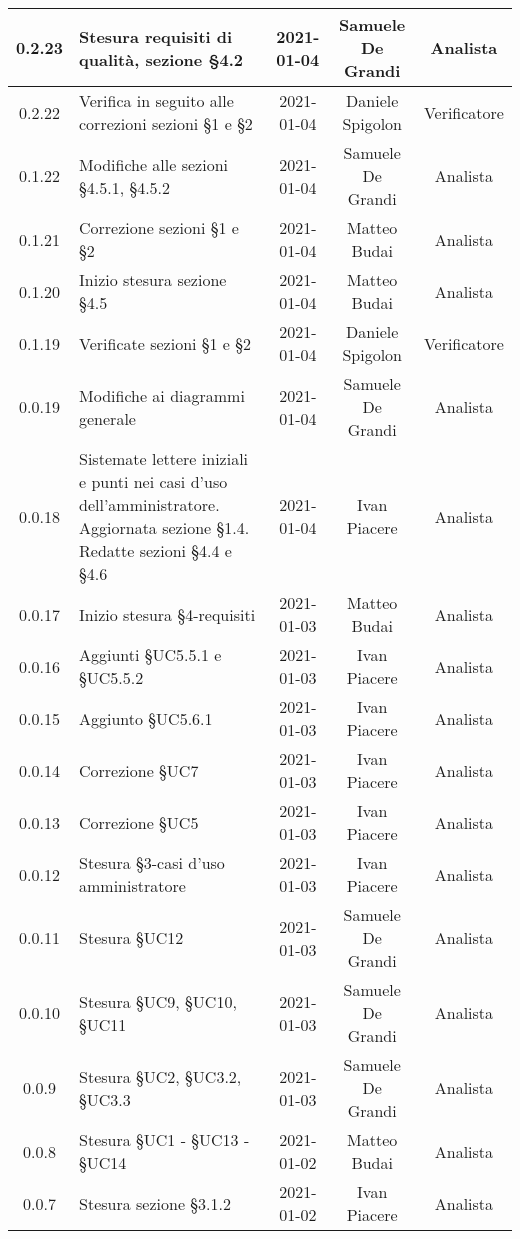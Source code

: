 \begin{center}
\begin{longtable}{|c|p{5cm}|c|c|c|}
		\hline
		0.2.23 & Stesura requisiti di qualità, sezione §4.2  & 2021-01-04 & Samuele De Grandi & Analista \\
		\hline
		0.2.22 & Verifica in seguito alle correzioni sezioni §1 e §2   & 2021-01-04 & Daniele Spigolon & Verificatore \\
		\hline
		0.1.22 & Modifiche alle sezioni §4.5.1, §4.5.2   & 2021-01-04 & Samuele De Grandi & Analista \\
		\hline
		0.1.21 & Correzione sezioni §1 e §2 & 2021-01-04 & Matteo Budai & Analista \\
		\hline
		0.1.20 & Inizio stesura sezione §4.5 & 2021-01-04 & Matteo Budai & Analista \\
		\hline
		0.1.19 & Verificate sezioni §1 e §2 & 2021-01-04 & Daniele Spigolon & Verificatore \\
		\hline
		0.0.19 & Modifiche ai diagrammi generale  & 2021-01-04 & Samuele De Grandi & Analista \\
		\hline
		0.0.18 & Sistemate lettere iniziali e punti nei casi d'uso dell'amministratore. Aggiornata sezione §1.4. Redatte sezioni §4.4 e §4.6 & 2021-01-04 & Ivan Piacere & Analista \\
		\hline
		0.0.17 & Inizio stesura §4-requisiti & 2021-01-03 & Matteo Budai & Analista \\
		\hline
		0.0.16 & Aggiunti §UC5.5.1 e §UC5.5.2 & 2021-01-03 & Ivan Piacere & Analista \\
		\hline
		0.0.15 & Aggiunto §UC5.6.1 & 2021-01-03 & Ivan Piacere & Analista \\
		\hline
		0.0.14 & Correzione §UC7 & 2021-01-03 & Ivan Piacere & Analista \\
		\hline
		0.0.13 & Correzione §UC5 & 2021-01-03 & Ivan Piacere & Analista \\
		\hline
		0.0.12 & Stesura §3-casi d'uso amministratore & 2021-01-03 & Ivan Piacere & Analista \\
		\hline
		0.0.11 & Stesura §UC12  & 2021-01-03 & Samuele De Grandi & Analista \\
		\hline
	    0.0.10 & Stesura §UC9, §UC10, §UC11  & 2021-01-03 & Samuele De Grandi & Analista \\
		\hline
		0.0.9 & Stesura §UC2, §UC3.2, §UC3.3  & 2021-01-03 & Samuele De Grandi & Analista \\
		\hline
		0.0.8 & Stesura §UC1 - §UC13 - §UC14 & 2021-01-02 & Matteo Budai & Analista \\
		\hline
		0.0.7 & Stesura sezione §3.1.2 & 2021-01-02 & Ivan Piacere & Analista\\

\end{longtable}
\end{center}
